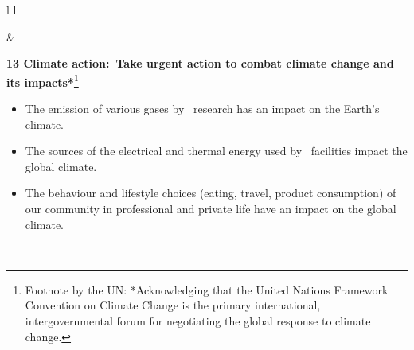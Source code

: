 \documentclass[../SustainableHEP.tex]{subfiles}
\begin{document}
\begin{longtable*}{l l}
\parbox[t]{\SDGleft\textwidth}{} & \savenotes\parbox[t]{\SDGright\textwidth}{\textbf{13 Climate action:\ Take urgent action to combat climate change and its impacts*}\footnote{Footnote by the UN: *Acknowledging that the United Nations Framework Convention on Climate Change is the primary international, intergovernmental forum for negotiating the global response to climate change.}
\vspace{\recskip}
\begin{itemize}[leftmargin=20pt]
\setlength{\itemsep}{\recskip}
\item The emission of various gases by \ACR\ research has an impact on the Earth’s climate.
\item The sources of the electrical and thermal energy used by \ACR\ facilities impact the global climate.
\item The behaviour and lifestyle choices (eating, travel, product consumption) of our community in professional and private life have an impact on the global climate.
\end{itemize}}\spewnotes\\


\end{longtable*}
\end{document}

